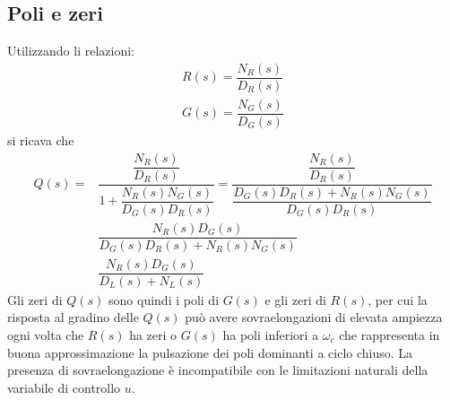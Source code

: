 \documentclass[a4paper]{report}
\begin{document}
\subsection{Poli e zeri}
Utilizzando li relazioni:
\[
\begin{array}{l}
  R(s) = \dfrac{N_R(s)}{D_R(s)}\\
  G(s) = \dfrac{N_G(s)}{D_G(s)}
\end{array}
\]
si ricava che
\[
\begin{array}{ll}
  Q(s) = & \dfrac{\dfrac{N_R(s)}{D_R(s)}}{1 +
    \dfrac{N_R(s)N_G(s)}{D_G(s)D_R(s)}} =
  \dfrac{\dfrac{N_R(s)}{D_R(s)}}{\dfrac{D_G(s)D_R(s) +
      N_R(s)N_G(s)}{D_G(s)D_R(s)}} \\
   & \dfrac{N_R(s)D_G(s)}{D_G(s)D_R(s) + N_R(s)N_G(s)}\\
   & \dfrac{N_R(s)D_G(s)}{D_L(s) + N_L(s)}
\end{array}
\]
Gli zeri di $Q(s)$ sono quindi i poli di $G(s)$ e gli zeri di $R(s)$,
per cui la risposta al gradino delle $Q(s)$ pu\`o avere
sovraelongazioni di elevata ampiezza ogni volta che $R(s)$ ha zeri o
$G(s)$ ha poli inferiori a $\omega_c$ che rappresenta in buona
approssimazione la pulsazione dei poli dominanti a ciclo chiuso. La
presenza di sovraelongazione \`e incompatibile con le limitazioni
naturali della variabile di controllo $u$.
\end{document}
